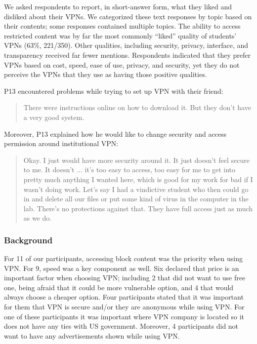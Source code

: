     We asked respondents to report, in short-answer form, what they liked and
disliked about their VPNs. We categorized these text responses by topic based
on their contents; some responses contained multiple topics. The ability to
access restricted content was by far the most commonly “liked” quality of
students’ VPNs (63\%, 221/350). Other qualities, including security, privacy,
interface, and transparency received far fewer mentions. Respondents indicated
that they prefer VPNs based on cost, speed, ease of use, privacy, and
security, yet they do not perceive the VPNs that they use as having those
positive qualities.


P13 encountered problems while trying to set up VPN with their friend:
\begin{quote}There were instructions online on how to download it. But they
don't have a very good system. \end{quote}

Moreover, P13 explained how he would like to change security and access
permission around institutional VPN: \begin{quote}Okay. I just would have more
    security around it. It just doesn't feel secure to me. It doesn't ... it's
    too easy to access, too easy for me to get into pretty much anything I
    wanted here, which is good for my work for bad if I wasn't doing work.
    Let's say I had a vindictive student who then could go in and delete all
    our files or put some kind of virus in the computer in the lab. There's no
    protections against that. They have full access just as much as we do. \end{quote}
    
    \subsubsection{Background}

For 11 of our participants, accessing block content was the priority when
using VPN. For 9, speed was a key component as well. Six declared that price
is an important factor when choosing VPN; including 2 that did not want to use
free one, being afraid that it could be more vulnerable option, and 4 that
would always choose a cheaper option. Four participants stated that it was
important for them that VPN is secure and/or they are anonymous while using
VPN. For one of these participants it was important where VPN company is
located so it does not have any ties with US government.  Moreover, 4
participants did not want to have any advertisements shown while using VPN. 

